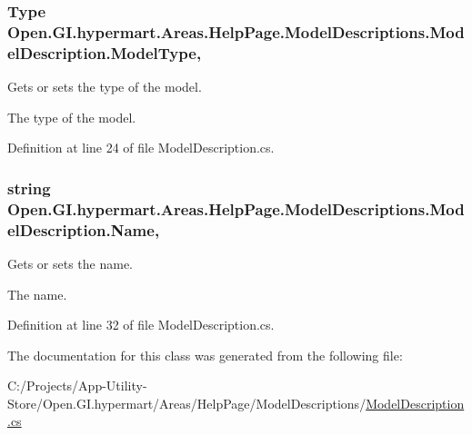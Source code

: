 \subsubsection[{Model\+Type}]{\setlength{\rightskip}{0pt plus 5cm}Type Open.\+G\+I.\+hypermart.\+Areas.\+Help\+Page.\+Model\+Descriptions.\+Model\+Description.\+Model\+Type\hspace{0.3cm}{\ttfamily [get]}, {\ttfamily [set]}}\label{class_open_1_1_g_i_1_1hypermart_1_1_areas_1_1_help_page_1_1_model_descriptions_1_1_model_description_ab41d4f322450e3a2cde611673ca4abb1}


Gets or sets the type of the model. 

The type of the model. 

Definition at line 24 of file Model\+Description.\+cs.

\hypertarget{class_open_1_1_g_i_1_1hypermart_1_1_areas_1_1_help_page_1_1_model_descriptions_1_1_model_description_aa5a42ec74b1d880ce15fd12b8ef0baf9}{}
\subsubsection[{Name}]{\setlength{\rightskip}{0pt plus 5cm}string Open.\+G\+I.\+hypermart.\+Areas.\+Help\+Page.\+Model\+Descriptions.\+Model\+Description.\+Name\hspace{0.3cm}{\ttfamily [get]}, {\ttfamily [set]}}\label{class_open_1_1_g_i_1_1hypermart_1_1_areas_1_1_help_page_1_1_model_descriptions_1_1_model_description_aa5a42ec74b1d880ce15fd12b8ef0baf9}


Gets or sets the name. 

The name. 

Definition at line 32 of file Model\+Description.\+cs.



The documentation for this class was generated from the following file\+:\begin{DoxyCompactItemize}
\item 
C\+:/\+Projects/\+App-\/\+Utility-\/\+Store/\+Open.\+G\+I.\+hypermart/\+Areas/\+Help\+Page/\+Model\+Descriptions/\hyperlink{_model_description_8cs}{Model\+Description.\+cs}\end{DoxyCompactItemize}
